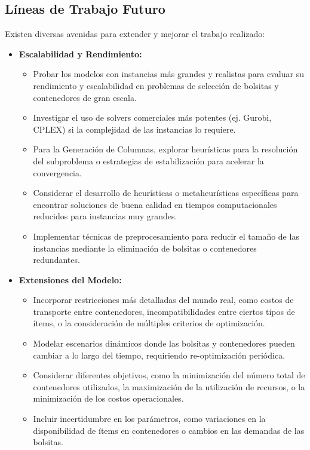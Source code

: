 \documentclass[a4paper,12pt]{article}
\begin{document}
\subsection{Líneas de Trabajo Futuro}
Existen diversas avenidas para extender y mejorar el trabajo realizado:
\begin{itemize}
    \item \textbf{Escalabilidad y Rendimiento:}
    \begin{itemize}
        \item Probar los modelos con instancias más grandes y realistas para evaluar su rendimiento y escalabilidad en problemas de selección de bolsitas y contenedores de gran escala.
        \item Investigar el uso de solvers comerciales más potentes (ej. Gurobi, CPLEX) si la complejidad de las instancias lo requiere.
        \item Para la Generación de Columnas, explorar heurísticas para la resolución del subproblema o estrategias de estabilización para acelerar la convergencia.
        \item Considerar el desarrollo de heurísticas o metaheurísticas específicas para encontrar soluciones de buena calidad en tiempos computacionales reducidos para instancias muy grandes.
        \item Implementar técnicas de preprocesamiento para reducir el tamaño de las instancias mediante la eliminación de bolsitas o contenedores redundantes.
    \end{itemize}
    \item \textbf{Extensiones del Modelo:}
    \begin{itemize}
        \item Incorporar restricciones más detalladas del mundo real, como costos de transporte entre contenedores, incompatibilidades entre ciertos tipos de ítems, o la consideración de múltiples criterios de optimización.
        \item Modelar escenarios dinámicos donde las bolsitas y contenedores pueden cambiar a lo largo del tiempo, requiriendo re-optimización periódica.
        \item Considerar diferentes objetivos, como la minimización del número total de contenedores utilizados, la maximización de la utilización de recursos, o la minimización de los costos operacionales.
        \item Incluir incertidumbre en los parámetros, como variaciones en la disponibilidad de ítems en contenedores o cambios en las demandas de las bolsitas.

\end{itemize}
\end{itemize}
\end{document}
